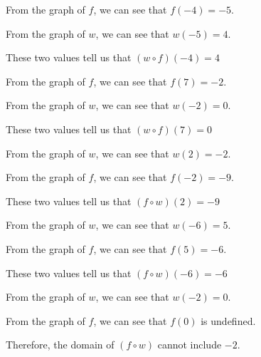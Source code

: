 \documentclass{ximera}
\begin{document}
\begin{example}

From the graph of $f$, we can see that $f(-4) = -5$.

From the graph of $w$, we can see that $w(-5) = 4$.

These two values tell us that $(w \circ f)(-4) = 4$

\end{example}






\begin{example}

From the graph of $f$, we can see that $f(7) = -2$.

From the graph of $w$, we can see that $w(-2) = 0$.

These two values tell us that $(w \circ f)(7) = 0$

\end{example}




\begin{example}

From the graph of $w$, we can see that $w(2) = -2$.

From the graph of $f$, we can see that $f(-2) = -9$.

These two values tell us that $(f \circ w)(2) = -9$

\end{example}





\begin{example}

From the graph of $w$, we can see that $w(-6) = 5$.

From the graph of $f$, we can see that $f(5) = -6$.

These two values tell us that $(f \circ w)(-6) = -6$

\end{example}








\begin{example}

From the graph of $w$, we can see that $w(-2) = 0$.

From the graph of $f$, we can see that $f(0)$ is undefined.

Therefore, the domain of $(f \circ w)$ cannot include $-2$.

\end{example}
\end{document}
